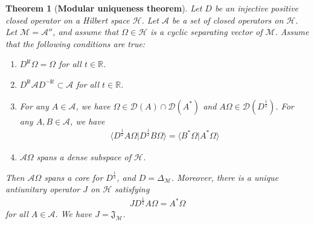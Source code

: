 \documentclass[12pt,b5paper,notitlepage]{article}
\theoremstyle{definition}
\theoremstyle{plain}
\newtheorem{thm}[df]{Theorem}
\newcommand{\fk}{\mathfrak}
\newcommand{\mc}{\mathcal}
\newcommand{\Dom}{\scr{D}}
\newcommand{\bk}[1]{\langle {#1}\rangle}
\newcommand{\scr}{\mathscr}
\newcommand{\im}{\mathbf{i}}
\newcommand{\Rbb}{\mathbb R}
\numberwithin{equation}{section}
\begin{document}
\begin{thm}[\textbf{Modular uniqueness theorem}]\label{lbb26}
Let $D$ be an injective positive closed operator on a Hilbert space $\mc H$. Let $\scr A$ be a set of closed operators on $\mc H$. Let $\mc M=\scr A''$, and assume that $\Omega\in\mc H$ is a cyclic separating vector of $\mc M$. Assume that the following conditions are true:
\begin{enumerate}[label=(\alph*)]
\item $D^{\im t}\Omega=\Omega$ for all $t\in\Rbb$.
\item $D^{\im t}\scr AD^{-\im t}\subset\scr A$ for all $t\in\Rbb$. 
\item For any $A\in\scr A$, we have $\Omega\in\Dom(A)\cap\Dom(A^*)$ and $A\Omega\in\Dom(D^{\frac 12})$. For any $A,B\in\scr A$, we have
\begin{align}\label{eqb40}
\bk{D^{\frac 12}A\Omega|D^{\frac 12}B\Omega}=\bk{B^*\Omega|A^*\Omega}
\end{align}
\item $\scr A\Omega$ spans a dense subspace of $\mc H$.
\end{enumerate}
Then $\scr A\Omega$ spans a core for $D^{\frac 12}$, and $D=\Delta_{\mc M}$. Moreover, there is a unique antiunitary operator $J$ on $\mc H$ satisfying
\begin{align}\label{eqb37}
JD^{\frac 12}A\Omega=A^*\Omega
\end{align}
for all $A\in\scr A$. We have $J=\fk J_{\mc M}$.
\end{thm}
\end{document}
